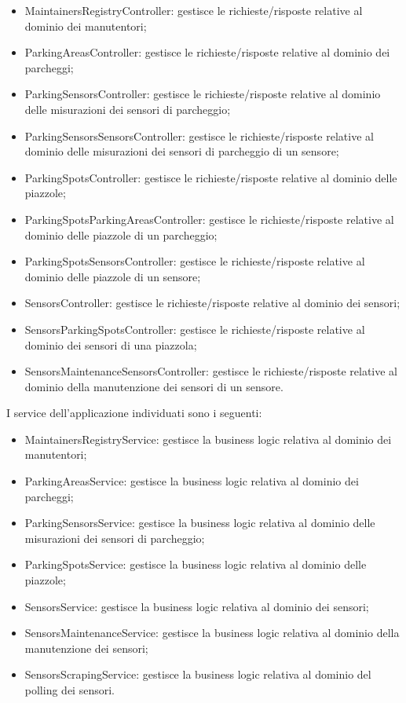 \begin{itemize}
    \item MaintainersRegistryController: gestisce le richieste/risposte relative al dominio dei manutentori;
    \item ParkingAreasController: gestisce le richieste/risposte relative al dominio dei parcheggi;
    \item ParkingSensorsController: gestisce le richieste/risposte relative al dominio delle misurazioni
    dei sensori di parcheggio;
    \item ParkingSensorsSensorsController: gestisce le richieste/risposte relative al dominio delle misurazioni
    dei sensori di parcheggio di un sensore;
    \item ParkingSpotsController: gestisce le richieste/risposte relative al dominio delle piazzole;
    \item ParkingSpotsParkingAreasController: gestisce le richieste/risposte relative al dominio delle piazzole
    di un parcheggio;
    \item ParkingSpotsSensorsController: gestisce le richieste/risposte relative al dominio delle piazzole
    di un sensore;
    \item SensorsController: gestisce le richieste/risposte relative al dominio dei sensori;
    \item SensorsParkingSpotsController: gestisce le richieste/risposte relative al dominio dei sensori di una
    piazzola;
    \item SensorsMaintenanceSensorsController: gestisce le richieste/risposte relative al dominio della manutenzione dei
    sensori di un sensore.
\end{itemize}
\leavevmode\newline
I service dell'applicazione individuati sono i seguenti:
\begin{itemize}
    \item MaintainersRegistryService: gestisce la business logic relativa al dominio dei manutentori;
    \item ParkingAreasService: gestisce la business logic relativa al dominio dei parcheggi;
    \item ParkingSensorsService: gestisce la business logic relativa al dominio delle misurazioni dei sensori di parcheggio;
    \item ParkingSpotsService: gestisce la business logic relativa al dominio delle piazzole;
    \item SensorsService: gestisce la business logic relativa al dominio dei sensori;
    \item SensorsMaintenanceService: gestisce la business logic relativa al dominio della manutenzione dei sensori;
    \item SensorsScrapingService: gestisce la business logic relativa al dominio del polling dei sensori.
\end{itemize}
